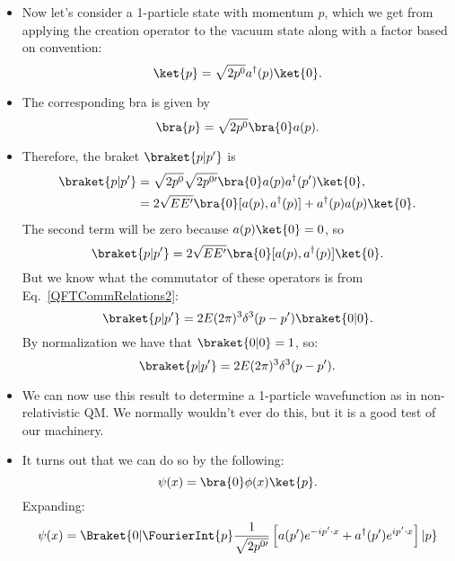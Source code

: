 \begin{itemize}
    \item Now let's consider a 1-particle state with momentum $p$, which we get from applying the creation operator to the vacuum state along with a factor based on convention:
        \begin{equation*}
            \ket{p} = \sqrt{2p^0} a^{\dagger}(p)\ket{0}.
        \end{equation*}
    \item The corresponding bra is given by
        \begin{equation*}
            \bra{p} = \sqrt{2p^0} \bra{0}a(p).
        \end{equation*}
    \item Therefore, the braket $\braket{p | p'}$ is
        \begin{align*}
            \braket{p | p'} &= \sqrt{2p^0}\sqrt{2p^{0\prime}} \bra{0} a(p) a^{\dagger}(p') \ket{0}, \\
            &= 2\sqrt{EE'} \bra{0} [a(p),a^{\dagger}(p)] + a^{\dagger}(p)a(p) \ket{0}.
        \end{align*}
        The second term will be zero because $a(p)\ket{0} = 0$, so
        \begin{equation*}
            \braket{p | p'} = 2\sqrt{EE'} \bra{0} [a(p),a^{\dagger}(p)] \ket{0}.
        \end{equation*}
        But we know what the commutator of these operators is from Eq.~\eqref{QFTCommRelations2}:
        \begin{equation*}
            \braket{p | p'} = 2E(2\pi)^3 \delta^3(p - p') \braket{0 | 0}.
        \end{equation*}
        By normalization we have that $\braket{0|0} = 1$, so:
        \begin{equation}
            \braket{p|p'} = 2E (2\pi)^3 \delta^3(p-p').\label{BraketPPprime}
        \end{equation}
    \item We can now use this result to determine a 1-particle wavefunction as in non-relativistic QM. We normally wouldn't ever do this, but it is a good test of our machinery.
    \item It turns out that we can do so by the following:
        \begin{equation}
            \psi(x) = \bra{0} \phi(x) \ket{p}.
        \end{equation}
        Expanding:
        \begin{equation*}
            \psi(x) = \Braket{0 | \FourierInt{p} \frac{1}{\sqrt{2p^{0\prime}}} \left[a(p')e^{-i p'\cdot x} + a^{\dagger}(p') e^{i p'\cdot x}\right] | p}

\end{equation*}
\end{itemize}

